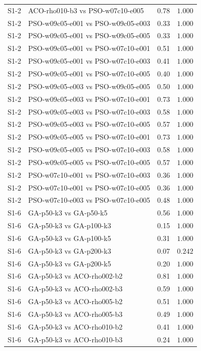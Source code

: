 \begin{tabular}{llrr}
S1-2 & ACO-rho010-b3 vs PSO-w07c10-e005 & 0.78 & $1.000$ \\
S1-2 & PSO-w09c05-e001 vs PSO-w09c05-e003 & 0.33 & $1.000$ \\
S1-2 & PSO-w09c05-e001 vs PSO-w09c05-e005 & 0.33 & $1.000$ \\
S1-2 & PSO-w09c05-e001 vs PSO-w07c10-e001 & 0.51 & $1.000$ \\
S1-2 & PSO-w09c05-e001 vs PSO-w07c10-e003 & 0.41 & $1.000$ \\
S1-2 & PSO-w09c05-e001 vs PSO-w07c10-e005 & 0.40 & $1.000$ \\
S1-2 & PSO-w09c05-e003 vs PSO-w09c05-e005 & 0.50 & $1.000$ \\
S1-2 & PSO-w09c05-e003 vs PSO-w07c10-e001 & 0.73 & $1.000$ \\
S1-2 & PSO-w09c05-e003 vs PSO-w07c10-e003 & 0.58 & $1.000$ \\
S1-2 & PSO-w09c05-e003 vs PSO-w07c10-e005 & 0.57 & $1.000$ \\
S1-2 & PSO-w09c05-e005 vs PSO-w07c10-e001 & 0.73 & $1.000$ \\
S1-2 & PSO-w09c05-e005 vs PSO-w07c10-e003 & 0.58 & $1.000$ \\
S1-2 & PSO-w09c05-e005 vs PSO-w07c10-e005 & 0.57 & $1.000$ \\
S1-2 & PSO-w07c10-e001 vs PSO-w07c10-e003 & 0.36 & $1.000$ \\
S1-2 & PSO-w07c10-e001 vs PSO-w07c10-e005 & 0.36 & $1.000$ \\
S1-2 & PSO-w07c10-e003 vs PSO-w07c10-e005 & 0.48 & $1.000$ \\
S1-6 & GA-p50-k3 vs GA-p50-k5 & 0.56 & $1.000$ \\
S1-6 & GA-p50-k3 vs GA-p100-k3 & 0.15 & $1.000$ \\
S1-6 & GA-p50-k3 vs GA-p100-k5 & 0.31 & $1.000$ \\
S1-6 & GA-p50-k3 vs GA-p200-k3 & 0.07 & $0.242$ \\
S1-6 & GA-p50-k3 vs GA-p200-k5 & 0.20 & $1.000$ \\
S1-6 & GA-p50-k3 vs ACO-rho002-b2 & 0.81 & $1.000$ \\
S1-6 & GA-p50-k3 vs ACO-rho002-b3 & 0.59 & $1.000$ \\
S1-6 & GA-p50-k3 vs ACO-rho005-b2 & 0.51 & $1.000$ \\
S1-6 & GA-p50-k3 vs ACO-rho005-b3 & 0.49 & $1.000$ \\
S1-6 & GA-p50-k3 vs ACO-rho010-b2 & 0.41 & $1.000$ \\
S1-6 & GA-p50-k3 vs ACO-rho010-b3 & 0.24 & $1.000$ \\

\end{tabular}

